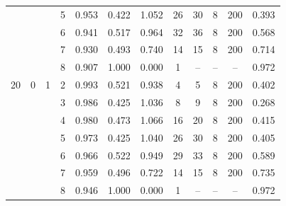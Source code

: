\documentclass[12pt]{article}
\begin{document}
\begin{table}
\begin{ruledtabular}
\begin{tabular}{cccccccccccc}
 & &  & 5 & 0.953 & 0.422 & 1.052 & 26 & 30 & 8 & 200 & 0.393 \\
 & &  & 6 & 0.941 & 0.517 & 0.964 & 32 & 36 & 8 & 200 & 0.568 \\
 & &  & 7 & 0.930 & 0.493 & 0.740 & 14 & 15 & 8 & 200 & 0.714 \\
 & &  & 8 & 0.907 & 1.000 & 0.000 & 1 & -- & -- & -- & 0.972 \\
\hline
20 & 0 & 1 & 2 & 0.993 & 0.521 & 0.938 & 4 & 5 & 8 & 200 & 0.402 \\
 & &  & 3 & 0.986 & 0.425 & 1.036 & 8 & 9 & 8 & 200 & 0.268 \\
 & &  & 4 & 0.980 & 0.473 & 1.066 & 16 & 20 & 8 & 200 & 0.415 \\
 & &  & 5 & 0.973 & 0.425 & 1.040 & 26 & 30 & 8 & 200 & 0.405 \\
 & &  & 6 & 0.966 & 0.522 & 0.949 & 29 & 33 & 8 & 200 & 0.589 \\
 & &  & 7 & 0.959 & 0.496 & 0.722 & 14 & 15 & 8 & 200 & 0.735 \\
 & &  & 8 & 0.946 & 1.000 & 0.000 & 1 & -- & -- & -- & 0.972
\end{tabular}
\end{ruledtabular}
\end{table}
\end{document}
